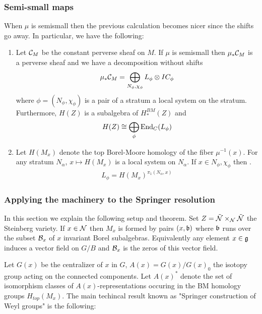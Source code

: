 \documentclass[12pt]{article}
\begin{document}
\subsubsection{Semi-small maps}
When $\mu$ is semismall then the previous calculation becomes nicer 
since the shifts go away. In particular, we have the following: 
\begin{theorem}
    \begin{enumerate}
        \item Let ${\mathcal{C}}_M$ be the constant perverse sheaf on $M$. If $\mu$ is semismall
        then $\mu_*{\mathcal{C}}_M$ is a perverse sheaf and we have a decomposition without shifts \begin{align*}
            \mu_*{\mathcal{C}}_M = \bigoplus_{N_\phi,\chi_\phi} L_\phi \otimes IC_\phi
        \end{align*} where $\phi = (N_\phi,\chi_\phi)$ is a pair of a stratum
        a local system on the stratum. Furthermore, $H(Z)$ is a
        subalgebra of $H^{BM}_*(Z)$ and \begin{align*}
            H(Z) \cong \bigoplus_\phi \operatorname{End}_C(L_\phi)
        \end{align*}
        \item Let $H(M_x)$ denote the top 
        Borel-Moore homology of the fiber $\mu^{-1}(x)$. For any 
        stratum $N_\alpha$, $x\mapsto H(M_x)$ is a local system on $N_\alpha$.
        If $x\in N_\phi,\chi_\phi$ then . \begin{align*}
            L_\phi = H(M_x)^{\pi_1(N_\alpha,x)}
        \end{align*}
    \end{enumerate}
\end{theorem}
\subsubsection{Applying the machinery to the Springer resolution}
In this section we explain the following setup and theorem.
Set $Z = \tilde {{\mathcal{N}}}\times_{\mathcal{N}} \tilde {{\mathcal{N}}}$ the Steinberg variety.
If $x\in {\mathcal{N}}$ then $M_x$ is formed by pairs $(x,\mathfrak{b})$ where $\mathfrak{b}$ 
runs over the subset ${\mathcal{B}}_x$ of $x$ invariant Borel subalgebras. Equivalently 
any element $x\in \mathfrak{g}$ induces a vector field on $G/B$ and ${\mathcal{B}}_x$ is the
zeros of this vector field.

\hfill 

Let $G(x)$ be the centralizer of $x$ in $G$, $A(x) = G(x)/G(x)_0$ the isotopy
group acting on the connected components. Let $A(x)^*$ denote the set of isomorphism classes
of $A(x)$-representations occuring in the BM homology groups $H_{top}(M_x)$.
The main techincal result known as "Springer construction of Weyl groups"
is the following:
\end{document}
